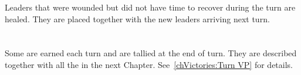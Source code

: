  Leaders that were wounded but did not have time to
recover during the turn are healed.
\bparag They are placed together with the new leaders arriving next turn.

\section{\VPs}
\aparag Some \VPs are earned each turn and are tallied at the end of turn.
\bparag They are described together with all the \VPs in the next
Chapter. See~\ref{chVictories:Turn VP} for details.

